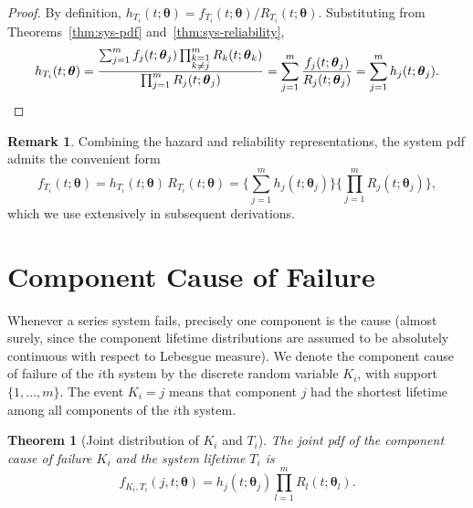 \documentclass[11pt]{article}
\theoremstyle{definition}
\newtheorem{remark}{Remark}
\theoremstyle{plain}
\newtheorem{theorem}{Theorem}
\renewcommand{\v}[1]{\boldsymbol{#1}}
\newcommand{\btheta}{\v{\theta}}
\begin{document}
\begin{proof}
By definition, $h_{T_i}(t; \btheta) = f_{T_i}(t; \btheta) / R_{T_i}(t; \btheta)$.
Substituting from Theorems~\ref{thm:sys-pdf} and~\ref{thm:sys-reliability},
\[
    h_{T_i}(t; \btheta)
    = \frac{\sum_{j=1}^m f_j(t; \v{\theta}_j)
            \prod_{\substack{k=1 \\ k \neq j}}^m R_k(t; \v{\theta}_k)}
           {\prod_{j=1}^m R_j(t; \v{\theta}_j)}
    = \sum_{j=1}^m \frac{f_j(t; \v{\theta}_j)}{R_j(t; \v{\theta}_j)}
    = \sum_{j=1}^m h_j(t; \v{\theta}_j).
    \qedhere
\]
\end{proof}

\begin{remark}
Combining the hazard and reliability representations, the system pdf
admits the convenient form
\begin{equation}
\label{eq:sys-pdf-convenient}
    f_{T_i}(t; \btheta)
    = h_{T_i}(t; \btheta) \, R_{T_i}(t; \btheta)
    = \biggl\{\sum_{j=1}^m h_j(t; \v{\theta}_j)\biggr\}
      \biggl\{\prod_{j=1}^m R_j(t; \v{\theta}_j)\biggr\},
\end{equation}
which we use extensively in subsequent derivations.
\end{remark}


\section{Component Cause of Failure}
\label{sec:cause-of-failure}

Whenever a series system fails, precisely one component is the cause
(almost surely, since the component lifetime distributions are assumed
to be absolutely continuous with respect to Lebesgue measure).
We denote the component cause of failure of the $i$th system by the
discrete random variable $K_i$, with support $\{1, \ldots, m\}$.
The event $K_i = j$ means that component $j$ had the shortest lifetime
among all components of the $i$th system.

\begin{theorem}[Joint distribution of $K_i$ and $T_i$]
\label{thm:joint-kt}
The joint pdf of the component cause of failure $K_i$ and the system
lifetime $T_i$ is
\begin{equation}
\label{eq:joint-kt}
    f_{K_i, T_i}(j, t; \btheta) = h_j(t; \v{\theta}_j)
        \prod_{l=1}^m R_l(t; \v{\theta}_l).
\end{equation}
\end{theorem}
\end{document}
